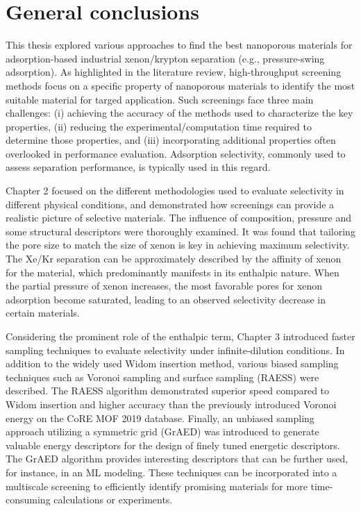 
\chapter*{General conclusions}

This thesis explored various approaches to find the best nanoporous materials for adsorption-based industrial xenon/krypton separation (e.g., pressure-swing adsorption). As highlighted in the literature review,\autocite{Ren_2022} high-throughput screening methods focus on a specific property of nanoporous materials to identify the most suitable material for targed application. Such screenings face three main challenges: (i) achieving the accuracy of the methods used to characterize the key properties, (ii) reducing the experimental/computation time required to determine those properties, and (iii) incorporating additional properties often overlooked in performance evaluation. Adsorption selectivity, commonly used to assess separation performance, is typically used in this regard.

Chapter 2 focused on the different methodologies used to evaluate selectivity in different physical conditions, and demonstrated how screenings can provide a realistic picture of selective materials.\autocite{Ren_2021} The influence of composition, pressure and some structural descriptors were thoroughly examined. It was found that tailoring the pore size to match the size of xenon is key in achieving maximum selectivity. The Xe/Kr separation can be approximately described by the affinity of xenon for the material, which predominantly manifests in its enthalpic nature. When the partial pressure of xenon increases, the most favorable pores for xenon adsorption become saturated, leading to an observed selectivity decrease in certain materials.
 
Considering the prominent role of the enthalpic term, Chapter 3 introduced faster sampling techniques to evaluate selectivity under infinite-dilution conditions. In addition to the widely used Widom insertion method, various biased sampling techniques such as Voronoi sampling and surface sampling (RAESS) were described. The RAESS algorithm\autocite{Ren_2023} demonstrated superior speed compared to Widom insertion and higher accuracy than the previously introduced Voronoi energy\autocite{Simon_2015} on the CoRE MOF 2019 database. Finally, an unbiased sampling approach utilizing a symmetric grid (GrAED) was introduced to generate valuable energy descriptors for the design of finely tuned energetic descriptors. The GrAED algorithm provides interesting descriptors that can be further used, for instance, in an ML modeling. These techniques can be incorporated into a multiscale screening to efficiently identify promising materials for more time-consuming calculations or experiments.

